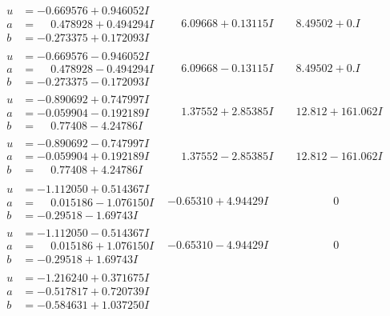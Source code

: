 \documentclass[1p]{elsarticle_modified}
\theoremstyle{definition}
\begin{document}
$$\begin{array}{c|c|c}
\begin{aligned}
u &= -0.669576 + 0.946052 I \\
a &= \phantom{-}0.478928 + 0.494294 I \\
b &= -0.273375 + 0.172093 I\end{aligned}
 & \phantom{-}6.09668 + 0.13115 I & \phantom{-}8.49502 + 0. I\phantom{ +0.000000I} \\ \hline\begin{aligned}
u &= -0.669576 - 0.946052 I \\
a &= \phantom{-}0.478928 - 0.494294 I \\
b &= -0.273375 - 0.172093 I\end{aligned}
 & \phantom{-}6.09668 - 0.13115 I & \phantom{-}8.49502 + 0. I\phantom{ +0.000000I} \\ \hline\begin{aligned}
u &= -0.890692 + 0.747997 I \\
a &= -0.059904 - 0.192189 I \\
b &= \phantom{-}0.77408 - 4.24786 I\end{aligned}
 & \phantom{-}1.37552 + 2.85385 I & \phantom{-}12.812 + 161.062 I \\ \hline\begin{aligned}
u &= -0.890692 - 0.747997 I \\
a &= -0.059904 + 0.192189 I \\
b &= \phantom{-}0.77408 + 4.24786 I\end{aligned}
 & \phantom{-}1.37552 - 2.85385 I & \phantom{-}12.812 - 161.062 I \\ \hline\begin{aligned}
u &= -1.112050 + 0.514367 I \\
a &= \phantom{-}0.015186 - 1.076150 I \\
b &= -0.29518 - 1.69743 I\end{aligned}
 & -0.65310 + 4.94429 I & \phantom{-0.000000 } 0 \\ \hline\begin{aligned}
u &= -1.112050 - 0.514367 I \\
a &= \phantom{-}0.015186 + 1.076150 I \\
b &= -0.29518 + 1.69743 I\end{aligned}
 & -0.65310 - 4.94429 I & \phantom{-0.000000 } 0 \\ \hline\begin{aligned}
u &= -1.216240 + 0.371675 I \\
a &= -0.517817 + 0.720739 I \\
b &= -0.584631 + 1.037250 I\end{aligned}

\end{array}$$
\end{document}
